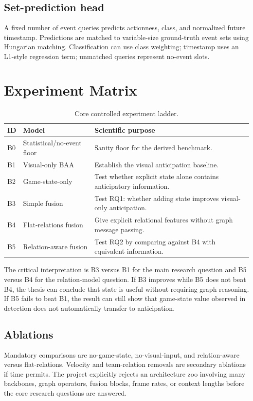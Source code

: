 \documentclass[11pt,a4paper]{article}
\begin{document}
\subsection{Set-prediction head}
A fixed number of event queries predicts actionness, class, and normalized future timestamp. Predictions are matched to variable-size ground-truth event sets using Hungarian matching. Classification can use class weighting; timestamp uses an L1-style regression term; unmatched queries represent no-event slots.

\section{Experiment Matrix}
\begin{table}[H]
\centering
\caption{Core controlled experiment ladder.}
\begin{tabularx}{\textwidth}{p{1.2cm}p{3.2cm}X}
\toprule
\textbf{ID} & \textbf{Model} & \textbf{Scientific purpose} \\
\midrule
B0 & Statistical/no-event floor & Sanity floor for the derived benchmark. \\
B1 & Visual-only BAA & Establish the visual anticipation baseline. \\
B2 & Game-state-only & Test whether explicit state alone contains anticipatory information. \\
B3 & Simple fusion & Test RQ1: whether adding state improves visual-only anticipation. \\
B4 & Flat-relations fusion & Give explicit relational features without graph message passing. \\
B5 & Relation-aware fusion & Test RQ2 by comparing against B4 with equivalent information. \\
\bottomrule
\end{tabularx}
\end{table}

The critical interpretation is B3 versus B1 for the main research question and B5 versus B4 for the relation-model question. If B3 improves while B5 does not beat B4, the thesis can conclude that state is useful without requiring graph reasoning. If B5 fails to beat B1, the result can still show that game-state value observed in detection does not automatically transfer to anticipation.

\subsection{Ablations}
Mandatory comparisons are no-game-state, no-visual-input, and relation-aware versus flat-relations. Velocity and team-relation removals are secondary ablations if time permits. The project explicitly rejects an architecture zoo involving many backbones, graph operators, fusion blocks, frame rates, or context lengths before the core research questions are answered.
\end{document}
